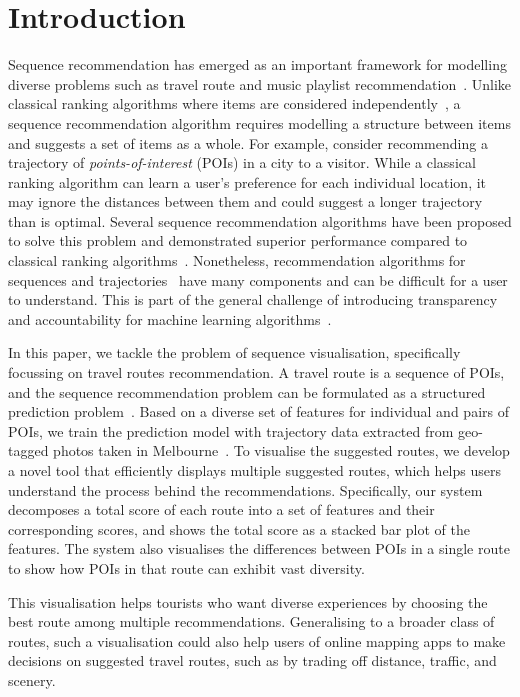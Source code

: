 
\section{Introduction}
Sequence recommendation has emerged as an important framework for modelling diverse problems such as travel route and music playlist recommendation~\cite{chen2017SR}. 
Unlike classical ranking algorithms where items are considered independently~\cite{koren2009matrix},
a sequence recommendation algorithm requires modelling a structure between items and suggests a set of items as a whole. 
For example, consider recommending a trajectory of \emph{points-of-interest} (POIs) in a city to a visitor. 
While a classical ranking algorithm can learn a user's preference for each individual location, it may ignore the distances between them and could suggest a longer trajectory than is optimal. 
Several sequence recommendation algorithms have been proposed to solve this problem and demonstrated superior performance compared to classical ranking algorithms~\cite{ijcai15,chen2017SR}. 
Nonetheless, recommendation algorithms for sequences and trajectories~\cite{chen2016learning,chen2017SR} have many components and can be difficult for a user to understand. This is part of the general challenge of introducing transparency and accountability for machine learning algorithms~\cite{fatml}. 

In this paper, we tackle the problem of sequence visualisation, specifically focussing on travel routes recommendation. 
A travel route is a sequence of POIs, and the sequence recommendation problem can be formulated as a structured prediction problem~\cite{chen2017SR}.
Based on a diverse set of features for individual and pairs of POIs, we train the prediction model with trajectory data extracted from geo-tagged photos taken in Melbourne~\cite{chen2016learning}. 
To visualise the suggested routes, we develop a novel tool that efficiently displays multiple suggested routes, which helps users understand the process behind the recommendations.
Specifically, our system decomposes a total score of each route into a set of features and their corresponding scores, and shows the total score as a stacked bar plot of the features.
The system also visualises the differences between POIs in a single route to show how POIs in that route can exhibit vast diversity. 

This visualisation helps tourists who want %
diverse experiences by choosing the best route among multiple recommendations. %
Generalising to a broader class of routes, such a visualisation could also help users of online mapping apps to make decisions on suggested travel routes, such as by trading off distance, traffic, and scenery. 
